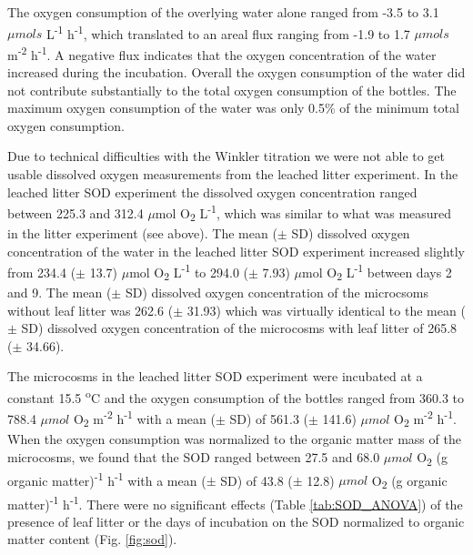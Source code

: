 The oxygen consumption of the overlying water alone ranged from -3.5 to 3.1 $\mu mols$ L\textsuperscript{-1} h\textsuperscript{-1}, which translated to an areal flux ranging from -1.9 to 1.7 $\mu mols$ m\textsuperscript{-2} h\textsuperscript{-1}. A negative flux indicates that the oxygen concentration of the water increased during the incubation. Overall the oxygen consumption of the water did not contribute substantially to the total oxygen consumption of the bottles. The maximum oxygen consumption of the water was only 0.5\% of the minimum total oxygen consumption.  

Due to technical difficulties with the Winkler titration we were not able to get usable dissolved oxygen measurements from the leached litter experiment. In the leached litter SOD experiment the dissolved oxygen concentration ranged between 225.3 and 312.4 $\mu$mol O\textsubscript{2} L\textsuperscript{-1}, which was similar to what was measured in the litter experiment (see above). The mean ($\pm$ SD) dissolved oxygen concentration of the water in the leached litter SOD experiment increased slightly from 234.4 ($\pm$ 13.7) $\mu$mol O\textsubscript{2} L\textsuperscript{-1} to 294.0 ($\pm$ 7.93) $\mu$mol O\textsubscript{2} L\textsuperscript{-1} between days 2 and 9.  The mean ($\pm$ SD) dissolved oxygen concentration of the  microcsoms without leaf litter was 262.6 ($\pm$ 31.93) which was virtually identical to the mean ($\pm$ SD) dissolved oxygen concentration of the microcosms with leaf litter of 265.8 ($\pm$ 34.66). 

The microcosms in the leached litter SOD experiment were incubated at a constant 15.5 \textsuperscript{o}C and the oxygen consumption of the bottles ranged from 360.3 to 788.4 $\mu mol$ O\textsubscript{2} m\textsuperscript{-2} h\textsuperscript{-1} with a mean ($\pm$ SD) of 561.3 ($\pm$ 141.6) $\mu mol$ O\textsubscript{2} m\textsuperscript{-2} h\textsuperscript{-1}. When the oxygen consumption was normalized to the organic matter mass of the microcosms, we found that the SOD ranged between 27.5 and 68.0 $\mu mol$ O\textsubscript{2} (g organic matter)\textsuperscript{-1} h\textsuperscript{-1} with a mean ($\pm$ SD) of 43.8 ($\pm$ 12.8) $\mu mol$ O\textsubscript{2} (g organic matter)\textsuperscript{-1} h\textsuperscript{-1}. There were no significant effects (Table \ref{tab:SOD_ANOVA}) of the presence of leaf litter or the days of incubation on the SOD normalized to organic matter content (Fig. \ref{fig:sod}).